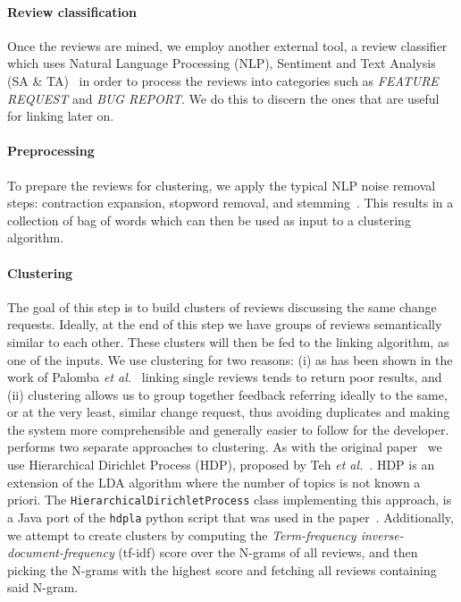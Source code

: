 \paragraph{Review classification}
Once the reviews are mined, we employ another external tool, a review classifier~\cite{panichella2016ardoc} which uses Natural Language Processing (NLP), Sentiment and Text Analysis (SA \& TA)~\cite{panichella2016ardoc} in order to process the reviews into categories such as \textit{FEATURE REQUEST} and \textit{BUG REPORT}. We do this to discern the ones that are useful for linking later on.

\paragraph{Preprocessing}
To prepare the reviews for clustering, we apply the typical NLP noise removal steps: contraction expansion, stopword removal, and stemming~\cite{Palomba2017}. This results in a collection of bag of words which can then be used as input to a clustering algorithm.

\paragraph{Clustering}
The goal of this step is to build clusters of reviews discussing the same change requests. Ideally, at the end of this step we have groups of reviews semantically similar to each other. These clusters will then be fed to the linking algorithm, as one of the inputs. We use clustering for two reasons: (i) as has been shown in the work of Palomba \textit{et al.}~\cite{Palomba2017} linking single reviews tends to return poor results, and (ii) clustering allows us to group together feedback referring ideally to the same, or at the very least, similar change request, thus avoiding duplicates and making the system more comprehensible and generally easier to follow for the developer. \tool{} performs two separate approaches to clustering. As with the original \tool{} paper~\cite{Palomba2017} we use Hierarchical Dirichlet Process (HDP), proposed by Teh \textit{et al.}~\cite{teh2005sharing}. HDP is an extension of the LDA algorithm where the number of topics is not known a priori. The \texttt{HierarchicalDirichletProcess} class implementing this approach, is a Java port of the \texttt{hdpla} python script that was used in the \tool{} paper~\cite{Palomba2017}.
Additionally, we attempt to create clusters by computing the \textit{Term-frequency inverse-document-frequency} (tf-idf) score over the N-grams of all reviews, and then picking the N-grams with the highest score and fetching all reviews containing said N-gram. 

